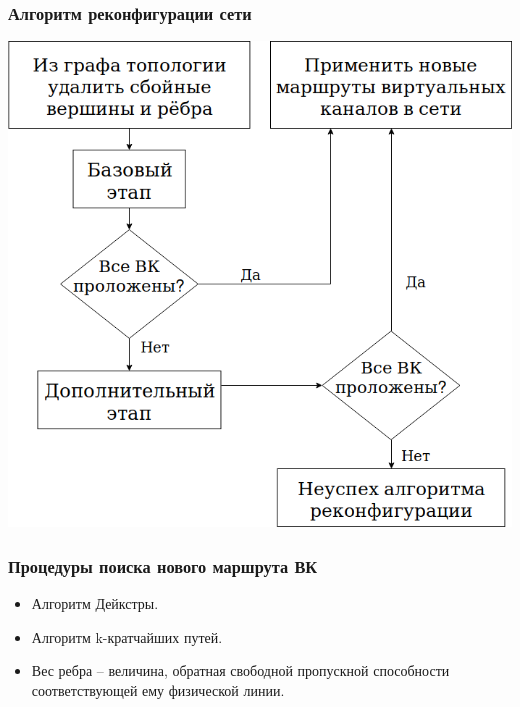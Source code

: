 \documentclass[14pt, handout]{beamer}
\begin{document}
\begin{frame}
\frametitle{Алгоритм реконфигурации сети}
\begin{center}
\includegraphics[height=0.85\textheight]{img/alg.png}
\end{center}
\end{frame}


\begin{frame}
\frametitle{Процедуры поиска нового маршрута ВК}
\begin{itemize}
	\item Алгоритм Дейкстры.
	\item Алгоритм k-кратчайших путей.
	\item Вес ребра -- величина, обратная свободной пропускной способности соответствующей ему физической линии.
\end{itemize}

\end{frame}
\end{document}
